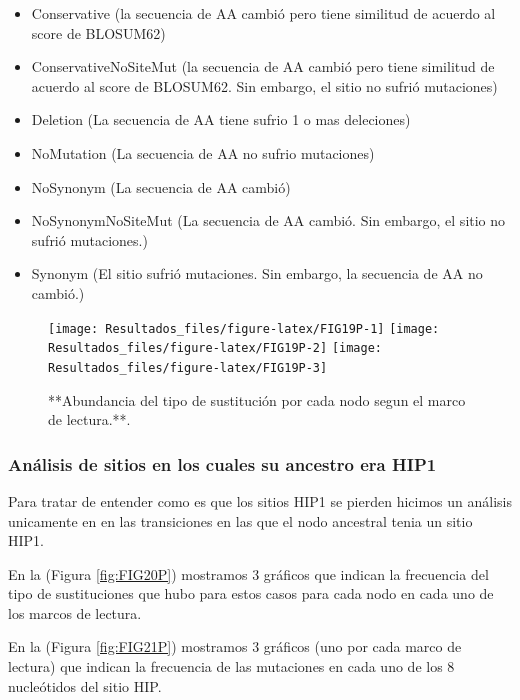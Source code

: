\documentclass[
]{book}
\providecommand{\tightlist}{%
  \setlength{\itemsep}{0pt}\setlength{\parskip}{0pt}}
\begin{document}
\begin{itemize}
\tightlist
\item
  Conservative (la secuencia de AA cambió pero tiene similitud de acuerdo al score de BLOSUM62)
\item
  ConservativeNoSiteMut (la secuencia de AA cambió pero tiene similitud de acuerdo al score de BLOSUM62. Sin embargo, el sitio no sufrió mutaciones)
\item
  Deletion (La secuencia de AA tiene sufrio 1 o mas deleciones)
\item
  NoMutation (La secuencia de AA no sufrio mutaciones)
\item
  NoSynonym (La secuencia de AA cambió)
\item
  NoSynonymNoSiteMut (La secuencia de AA cambió. Sin embargo, el sitio no sufrió mutaciones.)
\item
  Synonym (El sitio sufrió mutaciones. Sin embargo, la secuencia de AA no cambió.)
\end{itemize}

\begin{figure}

{\centering \texttt{[image: Resultados\_files/figure-latex/FIG19P-1]} \texttt{[image: Resultados\_files/figure-latex/FIG19P-2]} \texttt{[image: Resultados\_files/figure-latex/FIG19P-3]} 

}

\caption{**Abundancia del tipo de sustitución por cada nodo segun el marco de lectura.**.}\label{fig:FIG19P}
\end{figure}

\hypertarget{anuxe1lisis-de-sitios-en-los-cuales-su-ancestro-era-hip1-3}{%
\subsubsection{Análisis de sitios en los cuales su ancestro era HIP1}\label{anuxe1lisis-de-sitios-en-los-cuales-su-ancestro-era-hip1-3}}

Para tratar de entender como es que los sitios HIP1 se pierden hicimos un análisis unicamente en en las transiciones en las que el nodo ancestral tenia un sitio HIP1.

En la (Figura \ref{fig:FIG20P}) mostramos 3 gráficos que indican la frecuencia del tipo de sustituciones que hubo para estos casos para cada nodo en cada uno de los marcos de lectura.

En la (Figura \ref{fig:FIG21P}) mostramos 3 gráficos (uno por cada marco de lectura) que indican la frecuencia de las mutaciones en cada uno de los 8 nucleótidos del sitio HIP.
\end{document}
